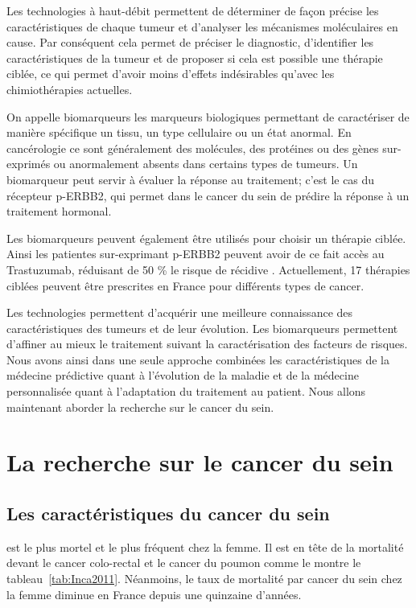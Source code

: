 			Les technologies à haut-débit permettent de déterminer de façon précise les caractéristiques de chaque tumeur et d'analyser les mécanismes moléculaires en cause.
			Par conséquent cela permet de préciser le diagnostic, d'identifier les caractéristiques de la tumeur et de proposer si cela est possible une thérapie ciblée, ce qui permet d'avoir moins d'effets indésirables qu'avec les chimiothérapies actuelles.

			On appelle biomarqueurs les marqueurs biologiques permettant de caractériser de manière spécifique un tissu, un type cellulaire ou un état anormal.
			En cancérologie ce sont généralement des molécules, des protéines ou des gènes sur-exprimés ou anormalement absents dans certains types de tumeurs.
			Un biomarqueur peut servir à évaluer la réponse au traitement; c'est le cas du récepteur \acs{p-ERBB2}, qui permet dans le cancer du sein de prédire la réponse à un traitement hormonal.

			Les biomarqueurs peuvent également être utilisés pour choisir un thérapie ciblée.
			Ainsi les patientes sur-exprimant \acs{p-ERBB2} peuvent avoir de ce fait accès au Trastuzumab, réduisant de 50 \% le risque de récidive \citep{Hudis2007}.
			Actuellement, 17 thérapies ciblées peuvent être prescrites en France pour différents types de cancer.

			Les technologies permettent d'acquérir une meilleure connaissance des caractéristiques des tumeurs et de leur évolution.
			Les biomarqueurs permettent d'affiner au mieux le traitement suivant la caractérisation des facteurs de risques.
			Nous avons ainsi dans une seule approche combinées les caractéristiques de la médecine prédictive quant à l'évolution de la maladie et de la médecine personnalisée quant à l'adaptation du traitement au patient.
			Nous allons maintenant aborder la recherche sur le cancer du sein.

	\section{\textcolor{red!45!black}{La recherche sur le cancer du sein}}\label{Sec:RechercheBC}

		\subsection{\textcolor{red!45!black}{Les caractéristiques du cancer du sein}}
			 est le plus mortel et le plus fréquent chez la femme.
			Il est en tête de la mortalité devant le cancer colo-rectal et le cancer du poumon comme le montre le tableau~\ref{tab:Inca2011}.
			Néanmoins, le taux de mortalité par cancer du sein chez la femme diminue en France depuis une quinzaine d'années.

